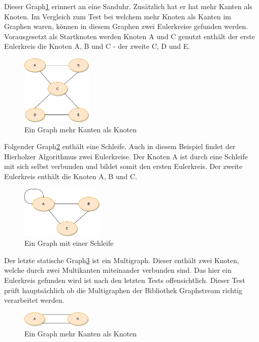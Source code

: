 Dieser Graph\ref{fig:fewerNodesThanEdges} erinnert an eine Sanduhr. Zusätzlich hat er hat mehr Kanten als Knoten. Im Vergleich zum Test bei welchem mehr Knoten als Kanten im Graphen waren, können in diesem Graphen zwei Eulerkreise gefunden werden. Vorausgesetzt als Startknoten werden Knoten A und C genutzt enthält der erste Eulerkreis die Knoten A, B und C - der zweite C, D und E. 

\begin{figure}[htbp]
	\centering
		\includegraphics[width=0.3\textwidth]{Latex/Figs/fewerNodesThanEdges.png}		
	\caption{Ein Graph mehr Kanten als Knoten}
	\label{fig:fewerNodesThanEdges}
\end{figure}

Folgender Graph\ref{fig:loop} enthält eine Schleife. Auch in diesem Beispiel findet der Hierholzer Algorithmus zwei Eulerkreise. Der Knoten A ist durch eine Schleife mit sich selbst verbunden und bildet somit den ersten Eulerkreis. Der zweite Eulerkreis enthält die Knoten A, B und C.

\begin{figure}[htbp]
	\centering
		\includegraphics[width=0.35\textwidth]{Latex/Figs/loop.png}		
	\caption{Ein Graph mit einer Schleife}
	\label{fig:loop}
\end{figure}

\newpage

Der letzte statische Graph\ref{fig:multiedge} ist ein Multigraph. Dieser enthält zwei Knoten, welche durch zwei Multikanten miteinander verbunden sind. Das hier ein Eulerkreis gefunden wird ist nach den letzten Tests offensichtlich. Dieser Test prüft hauptsächlich ob die Multigraphen der Bibliothek Graphstream richtig verarbeitet werden.

\begin{figure}[htbp]
	\centering
		\includegraphics[width=0.3\textwidth]{Latex/Figs/twoNodesMultiEdge.png}		
	\caption{Ein Graph mehr Kanten als Knoten}
	\label{fig:multiedge}
\end{figure}

